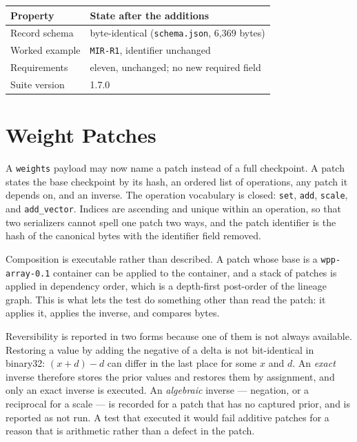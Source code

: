 \documentclass[11pt]{article}
\begin{document}
\begin{table}[h]
\centering
\begin{tabular}{@{}ll@{}}
\toprule
Property & State after the additions \\
\midrule
Record schema & byte-identical (\texttt{schema.json}, 6{,}369 bytes) \\
Worked example & \texttt{MIR-R1}, identifier unchanged \\
Requirements & eleven, unchanged; no new required field \\
Suite version & 1.7.0 \\
\bottomrule
\end{tabular}
\end{table}

\section{Weight Patches}

A \texttt{weights} payload may now name a patch instead of a full checkpoint. A
patch states the base checkpoint by its hash, an ordered list of operations, any
patch it depends on, and an inverse. The operation vocabulary is closed:
\texttt{set}, \texttt{add}, \texttt{scale}, and \texttt{add\_vector}. Indices are
ascending and unique within an operation, so that two serializers cannot spell
one patch two ways, and the patch identifier is the hash of the canonical bytes
with the identifier field removed.

Composition is executable rather than described. A patch whose base is a
\texttt{wpp-array-0.1} container can be applied to the container, and a stack of
patches is applied in dependency order, which is a depth-first post-order of the
lineage graph. This is what lets the test do something other than read the
patch: it applies it, applies the inverse, and compares bytes.

Reversibility is reported in two forms because one of them is not always
available. Restoring a value by adding the negative of a delta is not
bit-identical in binary32: $(x+d)-d$ can differ in the last place for some $x$
and $d$. An \emph{exact} inverse therefore stores the prior values and restores
them by assignment, and only an exact inverse is executed. An
\emph{algebraic} inverse --- negation, or a reciprocal for a scale --- is
recorded for a patch that has no captured prior, and is reported as not run. A
test that executed it would fail additive patches for a reason that is
arithmetic rather than a defect in the patch.
\end{document}
